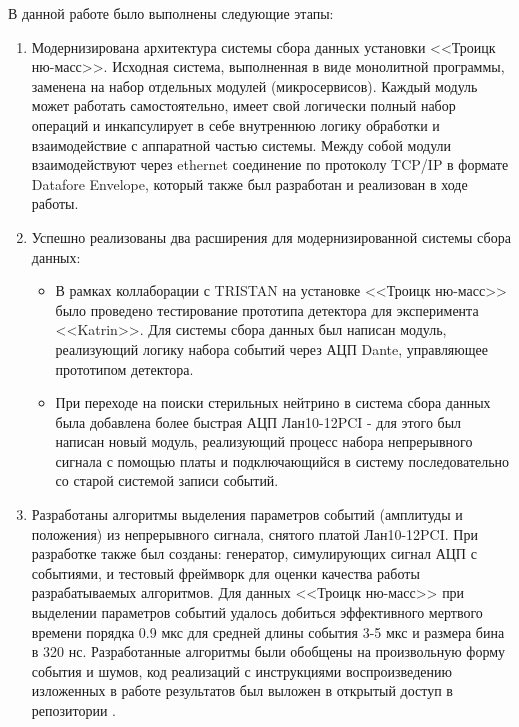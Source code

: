 \documentclass[a4paper,14pt]{extreport}
\begin{document}
В данной работе было выполнены следующие этапы:
\begin{enumerate}
    \item Модернизирована архитектура системы сбора данных установки <<Троицк ню-масс>>. Исходная система, выполненная в виде монолитной программы, заменена на набор отдельных модулей (микросервисов). Каждый модуль может работать самостоятельно, имеет свой логически полный набор операций и инкапсулирует в себе внутреннюю логику обработки и взаимодействие с аппаратной частью системы. Между собой модули взаимодействуют через ethernet соединение по протоколу TCP/IP в формате Datafore Envelope, который также был разработан и реализован в ходе работы.
    \item Успешно реализованы два расширения для модернизированной системы сбора данных:
    \begin{itemize}
        \item В рамках коллаборации с TRISTAN на установке <<Троицк ню-масс>> было проведено тестирование прототипа детектора для эксперимента <<Katrin>>. Для системы сбора данных был написан модуль, реализующий логику набора событий через АЦП Dante, управляющее прототипом детектора.
        \item При переходе на поиски стерильных нейтрино в система сбора данных была добавлена более быстрая АЦП Лан10-12PCI - для этого был написан новый модуль, реализующий процесс набора непрерывного сигнала с помощью платы и подключающийся в систему последовательно со старой системой записи событий.
    \end{itemize}
    \item Разработаны алгоритмы выделения параметров событий (амплитуды и положения) из непрерывного сигнала, снятого платой Лан10-12PCI. При разработке также был созданы: генератор, симулирующих сигнал АЦП с событиями, и тестовый фреймворк для оценки качества работы разрабатываемых алгоритмов. Для данных <<Троицк ню-масс>> при выделении параметров событий удалось добиться эффективного мертвого времени порядка 0.9 мкс для средней длины события 3-5 мкс и размера бина в 320 нс. Разработанные алгоритмы были обобщены на произвольную форму события и шумов, код реализаций с инструкциями воспроизведению изложенных в работе результатов был выложен в открытый доступ в репозитории \cite{signal-utils}\cite{lan10-processing}.
\end{enumerate}

\printbibliography
\end{document}
